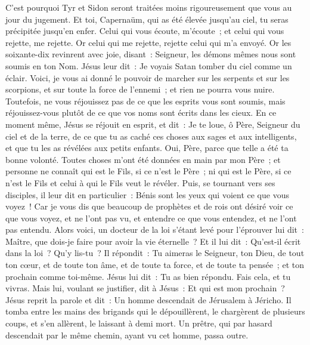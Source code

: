 \begin{multicols}{2}
C'est pourquoi Tyr et Sidon seront traitées moins rigoureusement que vous au jour du jugement.
Et toi, Capernaüm, qui as été élevée jusqu'au ciel, tu seras précipitée jusqu'en enfer.
Celui qui vous écoute, m'écoute~; et celui qui vous rejette, me rejette. Or celui qui me rejette, rejette celui qui m'a envoyé.
Or les soixante-dix revinrent avec joie, disant~: Seigneur, les démons mêmes nous sont soumis en ton Nom.
Jésus leur dit~: Je voyais Satan tomber du ciel comme un éclair.
Voici, je vous ai donné le pouvoir de marcher sur les serpents et sur les scorpions, et sur toute la force de l'ennemi~; et rien ne pourra vous nuire.
Toutefois, ne vous réjouissez pas de ce que les esprits vous sont soumis, mais réjouissez-vous plutôt de ce que vos noms sont écrits dans les cieux.
En ce moment même, Jésus se réjouit en esprit, et dit~: Je te loue, ô Père, Seigneur du ciel et de la terre, de ce que tu as caché ces choses aux sages et aux intelligents, et que tu les as révélées aux petits enfants. Oui, Père, parce que telle a été ta bonne volonté.
Toutes choses m'ont été données en main par mon Père~; et personne ne connaît qui est le Fils, si ce n'est le Père~; ni qui est le Père, si ce n'est le Fils et celui à qui le Fils veut le révéler.
Puis, se tournant vers ses disciples, il leur dit en particulier~: Bénis sont les yeux qui voient ce que vous voyez~!
Car je vous dis que beaucoup de prophètes et de rois ont désiré voir ce que vous voyez, et ne l'ont pas vu, et entendre ce que vous entendez, et ne l'ont pas entendu.
Alors voici, un docteur de la loi s'étant levé pour l'éprouver lui dit~: Maître, que dois-je faire pour avoir la vie éternelle~?
Et il lui dit~: Qu'est-il écrit dans la loi~? Qu'y lis-tu~?
Il répondit~: Tu aimeras le Seigneur, ton Dieu, de tout ton cœur, et de toute ton âme, et de toute ta force, et de toute ta pensée~; et ton prochain comme toi-même.
Jésus lui dit~: Tu as bien répondu. Fais cela, et tu vivras.
Mais lui, voulant se justifier, dit à Jésus~: Et qui est mon prochain~?
Jésus reprit la parole et dit~: Un homme descendait de Jérusalem à Jéricho. Il tomba entre les mains des brigands qui le dépouillèrent, le chargèrent de plusieurs coups, et s'en allèrent, le laissant à demi mort.
Un prêtre, qui par hasard descendait par le même chemin, ayant vu cet homme, passa outre.

\end{multicols}
